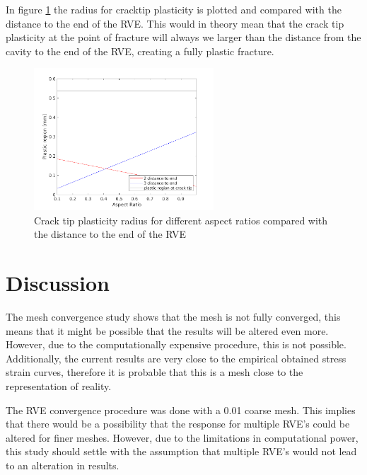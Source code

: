 In figure \ref{fig:cracktip} the radius for cracktip plasticity is plotted and compared with the distance to the end of the RVE. This would in theory mean that the crack tip plasticity at the point of fracture will always we larger than the distance from the cavity to the end of the RVE, creating a fully plastic fracture.  
\begin{figure}[H]
    \centering
    \includegraphics[width=0.60\textwidth]{chapter_7_non-elasticmodelling/figures/cracktip.png}
    \caption{Crack tip plasticity radius for different aspect ratios compared with the distance to the end of the RVE}
    \label{fig:cracktip}
\end{figure}


\section{Discussion}
The mesh convergence study shows that the mesh is not fully converged, this means that it might be possible that the results will be altered even more. However, due to the computationally expensive procedure, this is not possible. Additionally, the current results are very close to the empirical obtained stress strain curves, therefore it is probable that this is a mesh close to the representation of reality. 

The RVE convergence procedure was done with a 0.01 coarse mesh. This implies that there would be a possibility that the response for multiple RVE's could be altered for finer meshes. However, due to the limitations in computational power, this study should settle with the assumption that multiple RVE's would not lead to an alteration in results.  

